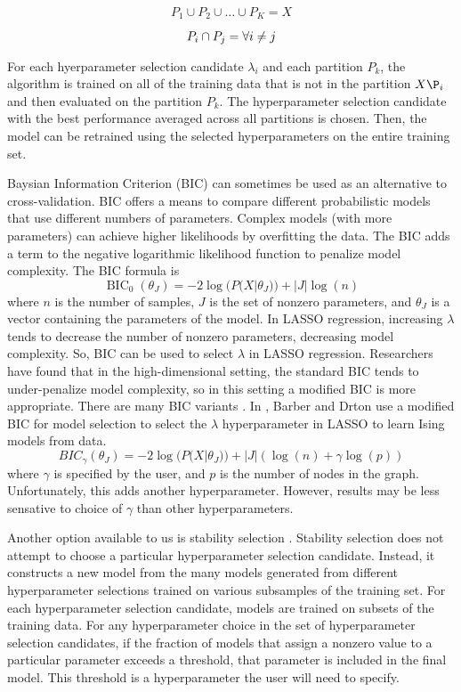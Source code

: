 \documentclass[11pt]{article}
\begin{document}
$$P_1 \cup P_2 \cup \hdots \cup P_K = X$$

$$P_i \cap P_j = \empty \forall i \neq j$$

For each hyerparameter selection candidate $\lambda_i$ and each partition $P_k$, the algorithm is trained on all of the training data that is not in the partition $X\P_i$ and then evaluated on the partition $P_k$. The hyperparameter selection candidate with the best performance averaged across all partitions is chosen. Then, the model can be retrained using the selected hyperparameters on the entire training set.

Baysian Information Criterion (BIC) \cite{Schwarz1978estimating} can sometimes be used as an alternative to cross-validation. BIC offers a means to compare different probabilistic models that use different numbers of parameters. Complex models (with more parameters) can achieve higher likelihoods by overfitting the data. The BIC adds a term to the negative logarithmic likelihood function to penalize model complexity. The BIC formula is
$$\operatorname{BIC}_0(\theta_J)  = -2\log(P(X|\theta_J)) + |J|\log(n)$$
where $n$ is the number of samples, $J$ is the set of nonzero parameters, and $\theta_J$ is a vector containing the parameters of the model.
In LASSO regression, increasing $\lambda$ tends to decrease the number of nonzero parameters, decreasing model complexity. So, BIC can be used to select $\lambda$ in LASSO regression. Researchers have found that in the high-dimensional setting, the standard BIC tends to under-penalize model complexity, so in this setting a modified BIC is more appropriate. There are many BIC variants \cite{zak2011modified}. In \cite{barber2015high}, Barber and Drton use a modified BIC for model selection to select the $\lambda$ hyperparameter in LASSO to learn Ising models from data.
$$BIC_{\gamma}(\theta_J) = -2\log(P(X|\theta_J)) + |J|(\log(n) + \gamma\log(p))$$
where $\gamma$ is specified by the user, and $p$ is the number of nodes in the graph. Unfortunately, this adds another hyperparameter.  However, results may be less sensative to choice of $\gamma$ than other hyperparameters.

Another option available to us is stability selection \cite{meinshausen2010stability}. Stability selection does not attempt to choose a particular hyperparameter selection candidate.  Instead, it constructs a new model from the many models generated from different hyperparameter selections trained on various subsamples of the training set. For each hyperparameter selection candidate, models are trained on subsets of the training data. For any hyperparameter choice in the set of hyperparameter selection candidates, if the fraction of models that assign a nonzero value to a particular parameter exceeds a threshold, that parameter is included in the final model. This threshold is a hyperparameter the user will need to specify.
\end{document}
